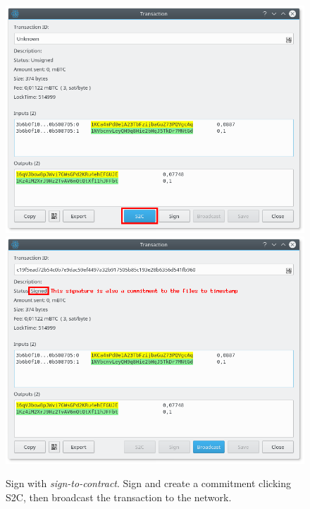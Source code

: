 \begin{figure}
	\begin{center}
		\includegraphics[width=0.9\linewidth]{Images/s2c.png}
		\includegraphics[width=0.9\linewidth]{Images/s2c-done.png}
		\caption[Sign with \textit{sign-to-contract}]{Sign with \textit{sign-to-contract}. Sign and create a commitment clicking S2C, then broadcast the transaction to the network.}
		\label{fig:s2c}
	\end{center}
\end{figure} 

